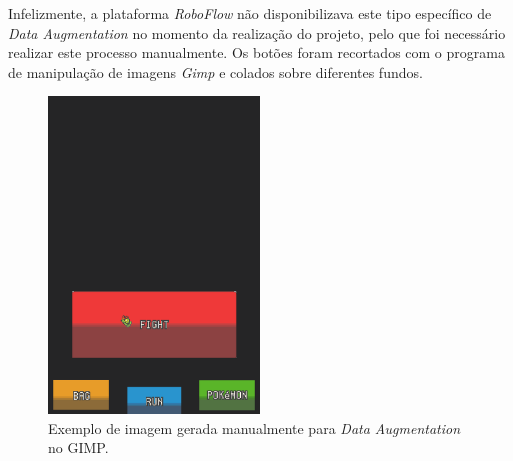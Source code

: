 Infelizmente, a plataforma \textit{RoboFlow} não disponibilizava este tipo específico de \textit{Data Augmentation} no momento da realização do projeto, pelo que foi necessário realizar este processo manualmente. Os botões foram recortados com o programa de manipulação de imagens \textit{Gimp} e colados sobre diferentes fundos.


\begin{figure}[h]
    \centering
    \includegraphics[width=0.5\textwidth]{imagens/augmentation_dark_gray.png}
    \caption{Exemplo de imagem gerada manualmente para \textit{Data Augmentation} no GIMP.}
    \label{fig:data_aug_gimp}
\end{figure}